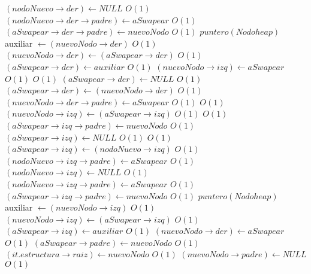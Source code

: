 \begin{Algoritmos}
\begin{algorithmic}[1]
									\State $(nodoNuevo \rightarrow der) \gets NULL$ \Comment $O(1)$
								\Else
									\State $(nodoNuevo \rightarrow der \rightarrow padre) \gets aSwapear$ \Comment $O(1)$
									\State $(aSwapear \rightarrow der \rightarrow padre) \gets nuevoNodo$ \Comment $O(1)$
									\State $puntero(Nodoheap)$ auxiliar $\gets (nuevoNodo \rightarrow der)$ \Comment $O(1)$
									\State $(nuevoNodo \rightarrow der) \gets (aSwapear \rightarrow der)$ \Comment $O(1)$
									\State $(aSwapear \rightarrow der) \gets auxiliar$ \Comment $O(1)$
								\EndIf
							\EndIf
						\State $(nuevoNodo \rightarrow izq) \gets aSwapear$ \Comment $O(1)$
					\Else
						 \Comment $O(1)$
								\State $(aSwapear \rightarrow der) \gets NULL$ \Comment $O(1)$
							\Else
								\State $(aSwapear \rightarrow der) \gets (nuevoNodo \rightarrow der)$ \Comment $O(1)$
								\State $(nuevoNodo \rightarrow der \rightarrow padre) \gets aSwapear$ \Comment $O(1)$
							\EndIf
							 \Comment $O(1)$
								\State $(nuevoNodo \rightarrow izq) \gets (aSwapear \rightarrow izq)$ \Comment $O(1)$
								 \Comment $O(1)$
									\State $(aSwapear \rightarrow izq \rightarrow padre) \gets nuevoNodo$	\Comment $O(1)$						
								\EndIf
								\State $(aSwapear \rightarrow izq) \gets NULL$ \Comment $O(1)$
							\Else
								 \Comment $O(1)$
									\State $(aSwapear \rightarrow izq) \gets (nodoNuevo \rightarrow izq)$ \Comment $O(1)$
									\State $(nodoNuevo \rightarrow izq \rightarrow padre) \gets aSwapear$ \Comment $O(1)$
									\State $(nodoNuevo \rightarrow izq) \gets NULL$ \Comment $O(1)$
								\Else
									\State $(nodoNuevo \rightarrow izq \rightarrow padre) \gets aSwapear$ \Comment $O(1)$
									\State $(aSwapear \rightarrow izq \rightarrow padre) \gets nuevoNodo$ \Comment $O(1)$
									\State $puntero(Nodoheap)$ auxiliar $\gets (nuevoNodo \rightarrow izq)$ \Comment $O(1)$
									\State $(nuevoNodo \rightarrow izq) \gets (aSwapear \rightarrow izq)$ \Comment $O(1)$
									\State $(aSwapear \rightarrow izq) \gets auxiliar$ \Comment $O(1)$
								\EndIf
							\EndIf
						\State $(nuevoNodo \rightarrow der) \gets aSwapear$ \Comment $O(1)$
					\EndIf	
					\State $(aSwapear \rightarrow padre) \gets nuevoNodo$ \Comment $O(1)$
					\State $(it.estructura \rightarrow raiz) \gets nuevoNodo$	 \Comment $O(1)$
					\State $(nuevoNodo \rightarrow padre) \gets NULL$			 \Comment $O(1)$

\end{algorithmic}
\end{Algoritmos}
